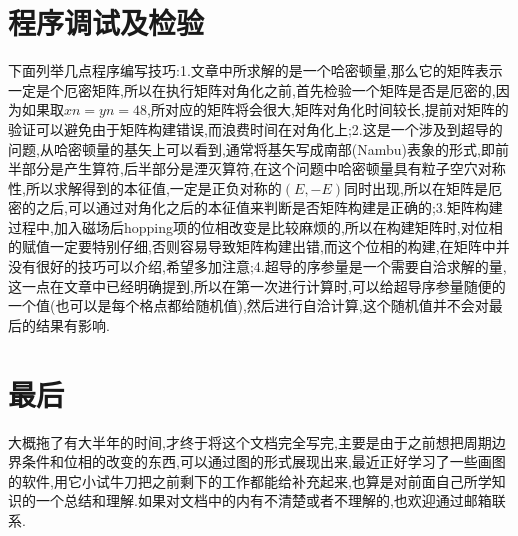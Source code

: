 \documentclass[a4paper,12pt]{ctexart}
\numberwithin{equation}{section}
\begin{document}
\section{程序调试及检验}
下面列举几点程序编写技巧:1.文章中所求解的是一个哈密顿量,那么它的矩阵表示一定是个厄密矩阵,所以在执行矩阵对角化之前,首先检验一个矩阵是否是厄密的,因为如果取$xn=yn=48$,所对应的矩阵将会很大,矩阵对角化时间较长,提前对矩阵的验证可以避免由于矩阵构建错误,而浪费时间在对角化上;2.这是一个涉及到超导的问题,从哈密顿量的基矢上可以看到,通常将基矢写成南部(Nambu)表象的形式,即前半部分是产生算符,后半部分是湮灭算符,在这个问题中哈密顿量具有粒子空穴对称性,所以求解得到的本征值,一定是正负对称的$(E,-E)$同时出现,所以在矩阵是厄密的之后,可以通过对角化之后的本征值来判断是否矩阵构建是正确的;3.矩阵构建过程中,加入磁场后hopping项的位相改变是比较麻烦的,所以在构建矩阵时,对位相的赋值一定要特别仔细,否则容易导致矩阵构建出错,而这个位相的构建,在矩阵中并没有很好的技巧可以介绍,希望多加注意;4.超导的序参量是一个需要自洽求解的量,这一点在文章中已经明确提到,所以在第一次进行计算时,可以给超导序参量随便的一个值(也可以是每个格点都给随机值),然后进行自洽计算,这个随机值并不会对最后的结果有影响.
\section{最后}
大概拖了有大半年的时间,才终于将这个文档完全写完,主要是由于之前想把周期边界条件和位相的改变的东西,可以通过图的形式展现出来,最近正好学习了一些画图的软件,用它小试牛刀把之前剩下的工作都能给补充起来,也算是对前面自己所学知识的一个总结和理解.如果对文档中的内有不清楚或者不理解的,也欢迎通过邮箱联系.


\newpage
	
\end{document}
